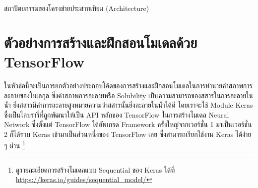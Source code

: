 สถาปัตยกรรมของโครงข่ายประสาทเทียม (Architecture)

\section{ตัวอย่างการสร้างและฝึกสอนโมเดลด้วย TensorFlow}
\label{sec:train_tf}

ในหัวข้อนี้จะเป็นการยกตัวอย่างประกอบโค้ดของการสร้างและฝึกสอนโมเดลในการทำนายค่าสภาพการละลายของโมเลกุล ซึ่งค่าสภาพการละลายหรือ
Solubility เป็นความสามารถของสสารในการละลายในน้ำ ยิ่งสสารมีค่าการละลายสูงหมายความว่าสสารนั้นยิ่งละลายในน้ำได้ดี โดยเราจะใช้ Module 
Keras ซึ่งเป็นไลบรารี่ที่ถูกพัฒนาให้เป็น API หลักของ TensorFlow ในการสร้างโมเดล Neural Network ซึ่งตั้งแต่ TensorFlow ได้อัพเกรด 
Framework ครั้งใหญ่จากเวอร์ชั่น 1 มาเป็นเวอร์ชั่น 2 ก็ได้รวบ Keras เข้ามาเป็นส่วนหนึ่งของ TensorFlow เลย ซึ่งสามารถเรียกใช้งาน Keras 
ได้ง่าย ๆ ผ่าน \footnote{ดูรายละเอียดการสร้างโมเดลแบบ Sequential ของ Keras ได้ที่ 
\url{https://keras.io/guides/sequential_model/}}

